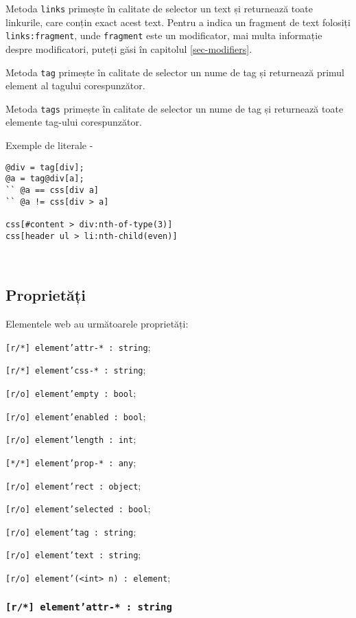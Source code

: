 Metoda \texttt{links} primește în calitate de selector un text și returnează toate linkurile, care conțin exact acest text. Pentru a indica un fragment de text folosiți \texttt{links:fragment}, unde \texttt{fragment} este un modificator, mai multa informație despre modificatori, puteți găsi în capitolul \ref{sec-modifiers}.

Metoda \texttt{tag} primește în calitate de selector un nume de tag și returnează primul element al tagului corespunzător.

Metoda \texttt{tags} primește în calitate de selector un nume de tag și returnează toate elemente tag-ului corespunzător.

Exemple de literale -
\begin{verbatim}
@div = tag[div];
@a = tag@div[a];
`` @a == css[div a]
`` @a != css[div > a]

css[#content > div:nth-of-type(3)]
css[header ul > li:nth-child(even)]
\end{verbatim}

\

\subsection{Proprietăți}

Elementele web au următoarele proprietăți:
\begin{icItems}
\item \texttt{[r/*] element'attr-* : string};
\item \texttt{[r/*] element'css-* : string};
\item \texttt{[r/o] element'empty : bool};
\item \texttt{[r/o] element'enabled : bool};
\item \texttt{[r/o] element'length : int};
\item \texttt{[*/*] element'prop-* : any};
\item \texttt{[r/o] element'rect : object};
\item \texttt{[r/o] element'selected : bool};
\item \texttt{[r/o] element'tag : string};
\item \texttt{[r/o] element'text : string};
\item \texttt{[r/o] element'(<int> n) : element};
\end{icItems} 

\subsubsection{\texttt{[r/*] element'attr-* : string}}


